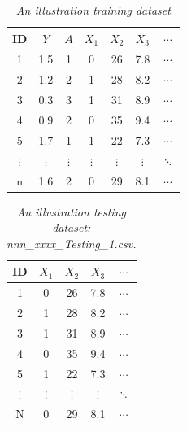 \documentclass[12pt]{article}
\begin{document}
\begin{table}[htbp]
  \centering
  \caption{\emph{An illustration training dataset}}
    \begin{tabular}{c|c|c|cccc}
    \hline
    \hline
    ID & $Y$     & $A$   & $X_1$    & $X_2$    & $X_3$    & $\cdots$ \\
    \hline
    1&1.5  & 1     & 0     & 26    & 7.8   & $\cdots$ \\
    2&1.2  & 2     & 1     & 28    & 8.2   & $\cdots$  \\
    3&0.3  & 3     & 1     & 31    & 8.9   & $\cdots$  \\
    4&0.9  & 2     & 0     & 35    & 9.4   & $\cdots$  \\
    5&1.7  & 1     & 1     & 22    & 7.3   & $\cdots$  \\
    $\vdots$ & $\vdots$    & $\vdots$    & $\vdots$   & $\vdots$     & $\vdots$     & $\ddots$  \\
    n & 1.6 & 2 & 0 & 29 & 8.1 & $\cdots$ \\
    \hline
    \hline
    \end{tabular}%
  \label{tab:TrainingDataExample}%
\end{table}%

\begin{table}[htbp]
  \centering
  \caption{\emph{An illustration testing dataset: nnn\_xxxx\_Testing\_1.csv.} }
    \begin{tabular}{c|cccc}
    \hline
    \hline
    ID &  $X_1$    & $X_2$    & $X_3$    & $\cdots$ \\
    \hline
    1& 0     & 26    & 7.8   & $\cdots$ \\
    2& 1     & 28    & 8.2   & $\cdots$  \\
    3& 1     & 31    & 8.9   & $\cdots$  \\
    4& 0     & 35    & 9.4   & $\cdots$  \\
    5& 1     & 22    & 7.3   & $\cdots$  \\
    $\vdots$ &  $\vdots$   & $\vdots$     & $\vdots$     & $\ddots$  \\
    N &  0 & 29 & 8.1 & $\cdots$ \\
    \hline
    \hline
    \end{tabular}%
  \label{tab:TestingDataExample1}%
\end{table}
\end{document}
